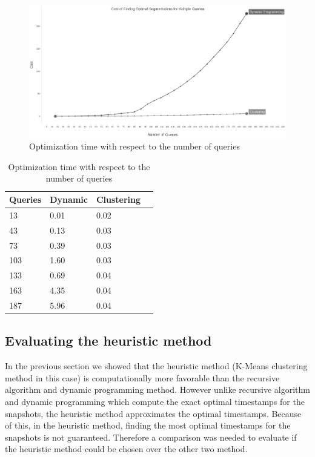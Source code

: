 			\begin{figure}
				\centering
				\includegraphics[width=\textwidth]{figs/multi_query_2.jpg}
				\caption{Optimization time with respect to the number of queries}
				\label{fig:variable_queries_2}
			\end{figure} 


			\begin {center}
			\begin{table}
				\centering
				\caption{Optimization time with respect to the number of queries}
				\label {table:variable_queries_2}
				\begin{tabular}{p{2cm}p{3cm}p{3cm}p{3cm}}
					\hline
					Queries  & Dynamic  & Clustering \\ \hline
					13 & 0.01  & 0.02  \\  
					43 & 0.13  & 0.03  \\
					73 & 0.39  & 0.03  \\
					103 & 1.60  & 0.03  \\
					133 & 0.69  & 0.04 \\
					163 & 4.35  & 0.04  \\
					187 & 5.96  & 0.04  \\\hline
				\end{tabular}
			\end{table}
			\end{center}

			\subsection{Evaluating the heuristic method}
			In the previous section we showed that the heuristic method (K-Means clustering method in this case) is computationally more favorable than the recursive algorithm and dynamic programming method. However unlike recursive algorithm and dynamic programming which compute the exact optimal timestamps for the snapshots, the heuristic method approximates the optimal timestamps. Because of this, in the heuristic method, finding the most optimal timestamps for the snapshots is not guaranteed. Therefore a comparison was needed to evaluate if the heuristic method could be chosen over the other two method.

